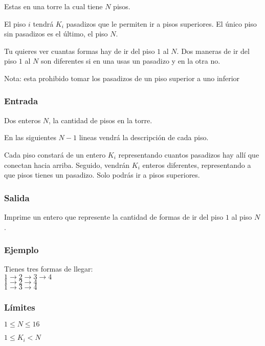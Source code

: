 Estas en una torre la cual tiene \(N\) pisos.

El piso \(i\) tendrá \(K_i\) pasadizos que le permiten ir a pisos superiores. El único piso sin pasadizos es el último, el piso \(N\).

Tu quieres ver cuantas formas hay de ir del piso \(1\) al \(N\). Dos maneras de ir del piso \(1\) al \(N\) son diferentes si en una usas un pasadizo y en la otra no.

Nota: esta prohibido tomar los pasadizos de un piso superior a uno inferior

\subsubsection*{Entrada}
Dos enteros \(N\), la cantidad de pisos en la torre.

En las siguientes \(N-1\) lineas vendrá la descripción de cada piso. 

Cada piso constará de un entero \(K_i\) representando cuantos pasadizos hay allí que conectan hacia arriba. Seguido, vendrán \(K_i\) enteros diferentes, representando a que pisos tienes un pasadizo. Solo podrás ir a pisos superiores.

\subsubsection*{Salida}
Imprime un entero que represente la cantidad de formas de ir del piso \(1\) al piso \(N\).

\subsubsection*{Ejemplo}
\begin{casebox3}
	{
		Tienes tres formas de llegar:\\
		\(1\rightarrow2\rightarrow3\rightarrow4\)\\
		\(1\rightarrow2\rightarrow4\)\\
		\(1\rightarrow3\rightarrow4\)\\
	}
\end{casebox3}

\subsubsection*{Límites}
\begin{plimits}
	\item \(1\leq N\leq 16\)
	\item \(1\leq K_i< N\)
\end{plimits}